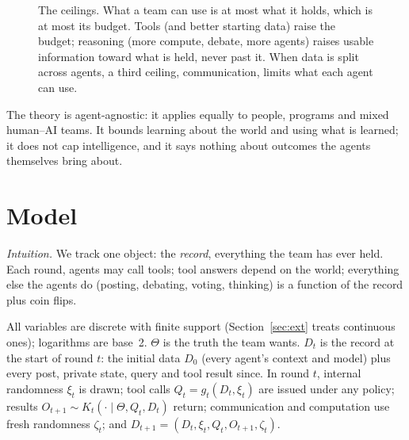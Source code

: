 \documentclass[conference]{IEEEtran}
\theoremstyle{definition}
\newcommand{\Hh}{H}
\newcommand{\intuition}[1]{\noindent\textit{Intuition.} #1}
\begin{document}
\begin{figure}[t]
\centering
{}
\caption{The ceilings. What a team can use is at most what it holds, which is
at most its budget. Tools (and better starting data) raise the budget; reasoning
(more compute, debate, more agents) raises usable information toward what is
held, never past it. When data is split across agents, a third ceiling,
communication, limits what each agent can use.}
\label{fig:ceilings}
\end{figure}

The theory is agent-agnostic: it applies equally to people, programs and mixed
human--AI teams. It bounds learning about the world and using what is learned;
it does not cap intelligence, and it says nothing about outcomes the agents
themselves bring about.

\section{Model}\label{sec:model}

\intuition{We track one object: the \emph{record}, everything the team has
ever held. Each round, agents may call tools; tool answers depend on the world;
everything else the agents do (posting, debating, voting, thinking) is a
function of the record plus coin flips.}

\smallskip
All variables are discrete with finite support (Section~\ref{sec:ext} treats
continuous ones); logarithms are base~2. $\Theta$ is the truth the team wants.
$D_t$ is the record at the start of round $t$: the initial data $D_0$ (every
agent's context and model) plus every post, private state, query and tool result
since. In round $t$, internal randomness $\xi_t$ is drawn; tool calls
$Q_t=g_t(D_t,\xi_t)$ are issued under any policy; results
$O_{t+1}\sim K_t(\cdot\mid\Theta,Q_t,D_t)$ return; communication and computation
use fresh randomness $\zeta_t$; and $D_{t+1}=(D_t,\xi_t,Q_t,O_{t+1},\zeta_t)$.
\end{document}
